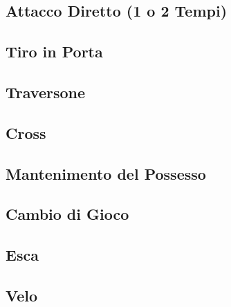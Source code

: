 \documentclass[../uefaC.tex]{subfiles}
\begin{document}
\subsection{Attacco Diretto (1 o 2 Tempi)}

\subsection{Tiro in Porta}

\subsection{Traversone}

\subsection{Cross}

\subsection{Mantenimento del Possesso}

\subsection{Cambio di Gioco}

\subsection{Esca}

\subsection{Velo}
\end{document}
